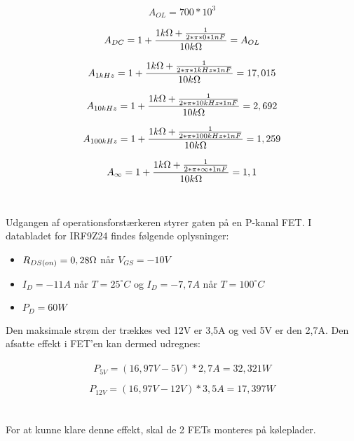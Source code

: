 \begin{equation}
	A_{OL} = 700 * 10^3
\end{equation}

\begin{equation}
	A_{DC} = 1 + \frac{1k\ohm + \frac{1}{2*\pi*0*1nF}}{10k\ohm} = A_{OL}
\end{equation}

\begin{equation}
	A_{1kHz} = 1 + \frac{1k\ohm + \frac{1}{2*\pi*1kHz*1nF}}{10k\ohm} = 17,015
\end{equation}

\begin{equation}
	A_{10kHz} = 1 + \frac{1k\ohm + \frac{1}{2*\pi*10kHz*1nF}}{10k\ohm} = 2,692
\end{equation}

\begin{equation}
	A_{100kHz} = 1 + \frac{1k\ohm + \frac{1}{2*\pi*100kHz*1nF}}{10k\ohm} = 1,259
\end{equation}

\begin{equation}
	A_{\infty} = 1 + \frac{1k\ohm + \frac{1}{2*\pi*\infty*1nF}}{10k\ohm} = 1,1
\end{equation}
\\\\
Udgangen af operationsforstærkeren styrer gaten på en P-kanal FET. I databladet for IRF9Z24 findes følgende oplysninger:
\begin{itemize}
\item $R_{DS(on)} = 0,28\ohm$ når $V_{GS} = -10V$
\item $I_D = -11A$ når $T = 25^{\circ}C$ og  $I_D = -7,7A$ når $T = 100^{\circ}C$
\item $P_D = 60W$
\end{itemize}

Den maksimale strøm der trækkes ved 12V er 3,5A og ved 5V er den 2,7A. Den afsatte effekt i FET'en kan dermed udregnes:
\\\\
\begin{equation}
	P_{5V} = (16,97V - 5V) * 2,7A = 32,321W
\end{equation}

\begin{equation}
	P_{12V} = (16,97V - 12V) * 3,5A = 17,397W
\end{equation}
\\\\
For at kunne klare denne effekt, skal de 2 FETs monteres på køleplader.

